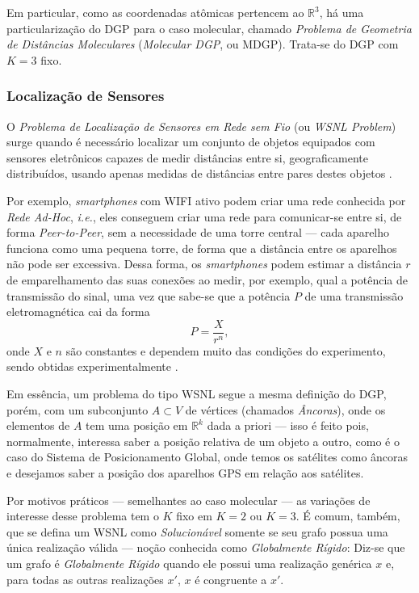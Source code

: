 Em particular, como as coordenadas atômicas pertencem ao $\mathbb{R}^3$, há uma particularização do DGP para o caso molecular, chamado \textit{Problema de Geometria de Distâncias Moleculares} (\textit{Molecular DGP}, ou MDGP). Trata-se do DGP com $K = 3$ fixo.

\subsubsection{Localização de Sensores}

O \textit{Problema de Localização de Sensores em Rede sem Fio} (ou \textit{WSNL Problem}) surge quando é necessário localizar um conjunto de objetos equipados com sensores eletrônicos capazes de medir distâncias entre si, geograficamente distribuídos, usando apenas medidas de distâncias entre pares destes objetos \cite{yemini1978positioning}. 

Por exemplo, \textit{smartphones} com WIFI ativo podem criar uma rede conhecida por \textit{Rede Ad-Hoc}, \textit{i.e.}, eles conseguem criar uma rede para comunicar-se entre si, de forma \textit{Peer-to-Peer}, sem a necessidade de uma torre central --- cada aparelho funciona como uma pequena torre, de forma que a distância entre os aparelhos não pode ser excessiva.
Dessa forma, os \textit{smartphones} podem estimar a distância $r$ de emparelhamento das suas conexões ao medir, por exemplo, qual a potência de transmissão do sinal, uma vez que sabe-se que a potência $P$ de uma transmissão eletromagnética cai da forma 
\begin{equation}
	P = \frac{X}{r^n},
\end{equation}
onde $X$ e $n$ são constantes e dependem muito das condições do experimento, sendo obtidas experimentalmente \cite{savvides2001dynamic}.

Em essência, um problema do tipo WSNL segue a mesma definição do DGP, porém, com um subconjunto $A\subset V$ de vértices (chamados \textit{Âncoras}), onde os elementos de $A$ tem uma posição em $\mathbb{R}^k$ dada a priori --- isso é feito pois, normalmente, interessa saber a posição relativa de um objeto a outro, como é o caso do Sistema de Posicionamento Global, onde temos os satélites como âncoras e desejamos saber a posição dos aparelhos GPS em relação aos satélites.

Por motivos práticos --- semelhantes ao caso molecular --- as variações de interesse desse problema tem o $K$ fixo em $K= 2$ ou $K=3$. É comum, também, que se defina um WSNL como \textit{Solucionável} somente se seu grafo possua uma única realização válida --- noção conhecida como \textit{Globalmente Rígido}: Diz-se que um grafo é \textit{Globalmente Rígido} quando ele possui uma realização genérica $x$ e, para todas as outras realizações $x'$, $x$ é congruente a $x'$. 

